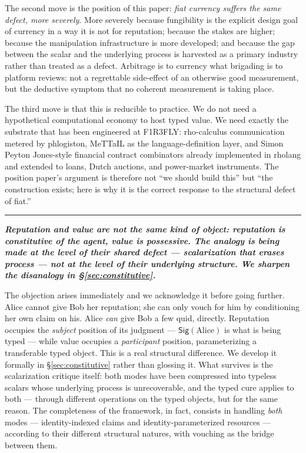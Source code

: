 \documentclass[11pt]{article}
\newcommand{\position}[1]{%
  \medskip
  \begin{quoting}[indentfirst=false, leftmargin=1em, rightmargin=1em]
  \noindent\textcolor{rhosky}{\rule{3pt}{1.2em}}\hspace{0.5em}\textbf{\textit{#1}}
  \end{quoting}
  \medskip
}
\newcommand{\Sig}{\mathsf{Sig}}
\begin{document}
The second move is the position of this paper: \emph{fiat currency suffers the same defect, more severely}. More severely because fungibility is the explicit design goal of currency in a way it is not for reputation; because the stakes are higher; because the manipulation infrastructure is more developed; and because the gap between the scalar and the underlying process is harvested as a primary industry rather than treated as a defect. Arbitrage is to currency what brigading is to platform reviews: not a regrettable side-effect of an otherwise good measurement, but the deductive symptom that no coherent measurement is taking place.

The third move is that this is reducible to practice. We do not need a hypothetical computational economy to host typed value. We need exactly the substrate that has been engineered at F1R3FLY: rho-calculus communication metered by phlogiston, MeTTaIL as the language-definition layer, and Simon Peyton Jones-style financial contract combinators already implemented in rholang and extended to loans, Dutch auctions, and power-market instruments. The position paper's argument is therefore not ``we should build this'' but ``the construction exists; here is why it is the correct response to the structural defect of fiat.''

\position{Reputation and value are not the same kind of object: reputation is constitutive of the agent, value is possessive. The analogy is being made at the level of their shared defect --- scalarization that erases process --- not at the level of their underlying structure. We sharpen the disanalogy in \S\ref{sec:constitutive}.}

The objection arises immediately and we acknowledge it before going further. Alice cannot give Bob her reputation; she can only vouch for him by conditioning her own claim on his. Alice \emph{can} give Bob a few quid, directly. Reputation occupies the \emph{subject} position of its judgment --- $\Sig(\text{Alice})$ is what is being typed --- while value occupies a \emph{participant} position, parameterizing a transferable typed object. This is a real structural difference. We develop it formally in \S\ref{sec:constitutive} rather than glossing it. What survives is the scalarization critique itself: both modes have been compressed into typeless scalars whose underlying process is unrecoverable, and the typed cure applies to both --- through different operations on the typed objects, but for the same reason. The completeness of the framework, in fact, consists in handling \emph{both} modes --- identity-indexed claims and identity-parameterized resources --- according to their different structural natures, with vouching as the bridge between them.
\end{document}
